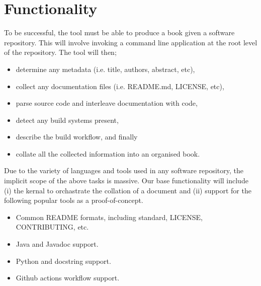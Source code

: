 \documentclass[12pt]{article}
\title{\thetitle}
\author{Brae Webb}
\date{Semester 1, 2022}
\begin{document}
\maketitle

\begin{abstract}
In 1984, Donald Knuth coined the term \textsl{literate programming}.
Literate programming proposes a paradigm shift wherein programmers are akin to authors,
and programs akin to books.
To successfully make the shift, programs and their documentation must be interleaved.
We propose \textsl{lit}, an \textbf{extensible} tool to transform software repositories into books.
\end{abstract}

\section{Functionality}
To be successful, the tool must be able to produce a book given a software repository.
This will involve invoking a command line application at the root level of the repository.
The tool will then;
\begin{itemize}
    \item determine any metadata (i.e. title, authors, abstract, etc),
    \item collect any documentation files (i.e. README.md, LICENSE, etc),
    \item parse source code and interleave documentation with code,
    \item detect any build systems present,
    \item describe the build workflow, and finally
    \item collate all the collected information into an organised book.
\end{itemize}

Due to the variety of languages and tools used in any software repository,
the implicit scope of the above tasks is massive.
Our base functionality will include (i) the kernal to orchastrate the collation of a document
and (ii) support for the following popular tools as a proof-of-concept.
\begin{itemize}
    \item Common README formats, including {\color{red} standard}, LICENSE, CONTRIBUTING, etc.
    \item Java and Javadoc support.
    \item Python and docstring support.
    \item Github actions workflow support.
\end{itemize}
\end{document}
